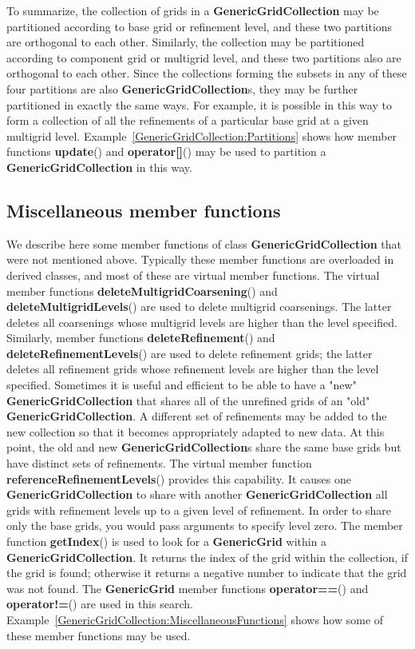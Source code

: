 \documentclass{article}
\begin{document}
To summarize, the collection of grids in a \textbf{GenericGridCollection} may be partitioned according to base grid or refinement
level, and these two partitions are orthogonal to each other.  Similarly, the collection may be partitioned according to component
grid or multigrid level, and these two partitions also are orthogonal to each other.  Since the collections forming the subsets in any
of these four partitions are also \textbf{GenericGridCollection}s, they may be further partitioned in exactly the same ways.  For
example, it is possible in this way to form a collection of all the refinements of a particular base grid at a given multigrid level.
Example~\ref{GenericGridCollection:Partitions} shows how member functions \textbf{update}() and
\textbf{operator[]}() may be used to partition a \textbf{GenericGridCollection} in this way.

\subsection{Miscellaneous member functions}
\label{GenericGridCollection:Miscellaneous}


We describe here some member functions of class \textbf{GenericGridCollection}
that were not mentioned above.  Typically these member functions are overloaded in
derived classes, and most of these are virtual member functions.  The virtual member
functions \textbf{deleteMultigridCoarsening}() and
\textbf{deleteMultigridLevels}() are used to delete multigrid coarsenings.
The latter deletes all coarsenings whose multigrid levels are higher than the level
specified.  Similarly, member functions \textbf{deleteRefinement}() and
\textbf{deleteRefinementLevels}() are used to delete refinement grids;
the latter deletes all refinement grids whose refinement levels are higher than the
level specified.  Sometimes it is useful and efficient to be able to have a "new"
\textbf{GenericGridCollection} that shares all of the unrefined grids of
an "old" \textbf{GenericGridCollection}.  A different set of refinements
may be added to the new collection so that it becomes appropriately adapted to new
data.  At this point, the old and new \textbf{GenericGridCollection}s share
the same base grids but have distinct sets of refinements.  The virtual member
function \textbf{referenceRefinementLevels}() provides this capability.  It
causes one \textbf{GenericGridCollection} to share with another
\textbf{GenericGridCollection} all grids with refinement levels up to a
given level of refinement.  In order to share only the base grids, you would pass
arguments to specify level zero.  The member function \textbf{getIndex}()
is used to look for a \textbf{GenericGrid} within a
\textbf{GenericGridCollection}.  It returns the index of the grid within
the collection, if the grid is found; otherwise it returns a negative number to
indicate that the grid was not found.  The \textbf{GenericGrid} member
functions \textbf{operator==}() and \textbf{operator!=}() are used
in this search.  Example~\ref{GenericGridCollection:MiscellaneousFunctions} shows
how some of these member functions may be used.
\end{document}
